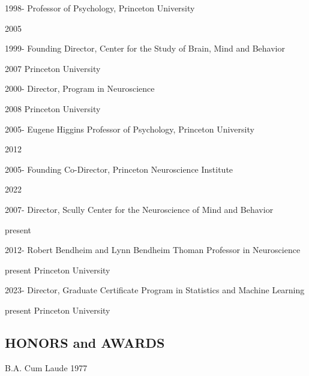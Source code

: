 \documentclass[10 pt]{article}
\begin{document}
1998- \hspace{0.41in} Professor of Psychology, Princeton University

2005
    \smallskip

1999- \hspace{0.41in} Founding Director, Center for the Study of Brain, Mind and Behavior

2007 \hspace{0.46in} Princeton University
    \smallskip

2000- \hspace{0.41in} Director, Program in Neuroscience

2008 \hspace{0.46in} Princeton University
    \smallskip

2005- \hspace{0.41in} Eugene Higgins Professor of Psychology, Princeton University

2012
    \smallskip

2005- \hspace{0.41in} Founding Co-Director, Princeton Neuroscience Institute

2022
    \smallskip

2007- \hspace{0.41in} Director, Scully Center for the Neuroscience of Mind and Behavior

present
    \smallskip

2012- \hspace{0.41in} Robert Bendheim and Lynn Bendheim Thoman Professor in Neuroscience

present \hspace{0.3in} Princeton University
    \smallskip

2023- \hspace{0.41in} Director, Graduate Certificate Program in Statistics and Machine Learning

present \hspace{0.3in} Princeton University

\newpage


    \begin{center}
\section*{HONORS and AWARDS} \label{secHaA}
    \end{center}
    \vspace{.2in}

B.A. Cum Laude \hspace{4.5in} 1977
\end{document}
